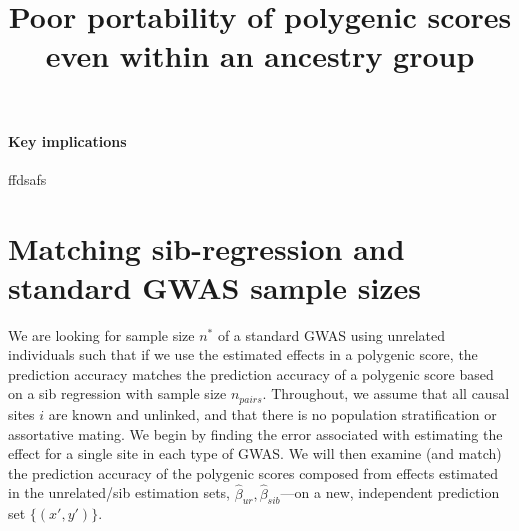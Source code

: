\documentclass[hidelinks, 12pt]{article}
\title{Poor portability of polygenic scores even within an ancestry group}
\newcommand{\beginsupplement}{%
    \setcounter{table}{0}
    \renewcommand{\thetable}{S\arabic{table}}%
    \setcounter{figure}{0}
    \renewcommand{\thefigure}{S\arabic{figure}}%
}
\begin{document}
 
\baselineskip24pt

\maketitle 
\begin{center}
\end{center}
\clearpage

\begingroup
  \hypersetup{hidelinks}
  \tableofcontents
\endgroup

\listoffigures
\listoftables

\pagebreak

\beginsupplement

\paragraph{Key implications}
ffdsafs

\section{Matching sib-regression and standard GWAS sample sizes}
We are looking for sample size $n^*$ of a standard GWAS using unrelated individuals such that if we use the estimated effects in a polygenic score, the prediction accuracy matches the prediction accuracy of a polygenic score based on a sib regression with sample size $n_{pairs}$. Throughout, we assume that all causal sites $i$ are known and unlinked, and that there is no population stratification or assortative mating.  We begin by finding the error associated with estimating the effect for a single site in each type of GWAS.  We will then examine (and match) the prediction accuracy of the polygenic scores composed from effects estimated in the unrelated/sib estimation sets, $\hat{\beta}_{ur},\hat{\beta}_{sib}$---on a new, independent prediction set $\{(x',y')\}$.
\end{document}
